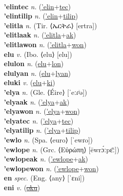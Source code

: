  \label{'elin'kilistosfitilip} \\
\textbf{'elintec} \textit{n.} (\hyperref['elin]{'elin}+\hyperref[tec]{tec})
 \label{'elintec} \\
\textbf{'elintilip} \textit{n.} (\hyperref['elin]{'elin}+\hyperref[tilip]{tilip})
 \label{'elintilip} \\
\textbf{'elitla} \textit{n.} (Tir. ⟨ኤርትራ⟩ [ertra])
 \label{'elitla} \\
\textbf{'elitlaak} \textit{n.} (\hyperref['elitla]{'elitla}+\hyperref[ak]{ak})
 \label{'elitlaak} \\
\textbf{'elitlawon} \textit{n.} (\hyperref['elitla]{'elitla}+\hyperref[won]{won})
 \label{'elitlawon} \\
\textbf{elu} \textit{v.} (Ibo. ⟨elu⟩ [elu])
 \label{elu} \\
\textbf{elulon} \textit{n.} (\hyperref[elu]{elu}+\hyperref[lon]{lon})
 \label{elulon} \\
\textbf{elulyan} \textit{n.} (\hyperref[elu]{elu}+\hyperref[lyan]{lyan})
 \label{elulyan} \\
\textbf{eluki} \textit{v.} (\hyperref[elu]{elu}+\hyperref[ki]{ki})
 \label{eluki} \\
\textbf{'elya} \textit{n.} (Gle. ⟨Éire⟩ [ˈeːɾʲə])
 \label{'elya} \\
\textbf{'elyaak} \textit{n.} (\hyperref['elya]{'elya}+\hyperref[ak]{ak})
 \label{'elyaak} \\
\textbf{'elyawon} \textit{n.} (\hyperref['elya]{'elya}+\hyperref[won]{won})
 \label{'elyawon} \\
\textbf{'elyatec} \textit{n.} (\hyperref['elya]{'elya}+\hyperref[tec]{tec})
 \label{'elyatec} \\
\textbf{'elyatilip} \textit{n.} (\hyperref['elya]{'elya}+\hyperref[tilip]{tilip})
 \label{'elyatilip} \\
\textbf{'ewlo} \textit{n.} (Spa. ⟨euro⟩ [ˈewɾo])
 \label{'ewlo} \\
\textbf{'ewlope} \textit{n.} (Grc. ⟨Εὐρώπη⟩ [ēwrɔ́ːpɛ̄ː])
 \label{'ewlope} \\
\textbf{'ewlopeak} \textit{n.} (\hyperref['ewlope]{'ewlope}+\hyperref[ak]{ak})
 \label{'ewlopeak} \\
\textbf{'ewlopewon} \textit{n.} (\hyperref['ewlope]{'ewlope}+\hyperref[won]{won})
 \label{'ewlopewon} \\
\textbf{en} \textit{spec.} (Eng. ⟨any⟩ [ˈɛni])
 \label{en} \\
\textbf{eni} \textit{v.} (\hyperref[oku]{\sout{oku}})
 \label{eni} \\
